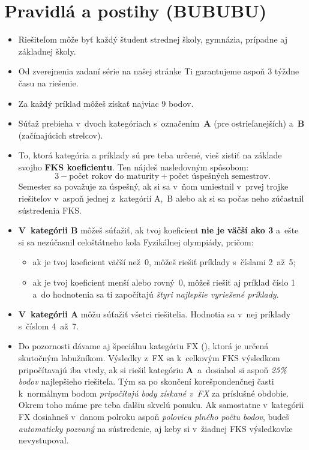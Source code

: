 \pagestyle{rules}

\section{Pravidlá a postihy (BUBUBU)}
    \begin{itemize}
        \item Riešiteľom môže byť každý študent strednej školy, gymnázia, prípadne aj základnej školy.
        
        \item Od zverejnenia zadaní série na našej stránke Ti garantujeme aspoň 3 týždne času na riešenie.
    
        \item Za každý príklad môžeš získať najviac 9 bodov. 
    
        \item Súťaž prebieha v~dvoch kategóriach s~označením~\textbf{A} (pre ostrieľanejších) a~\textbf{B} (začínajúcich strelcov).
    
        \item To, ktorá kategória a príklady sú pre teba určené, vieš zistiť na základe svojho \textbf{FKS koeficientu}. 
            Ten nájdeš nasledovným spôsobom:
            $$3 - \text{počet rokov do maturity} + \text{počet úspešných semestrov.}$$
            Semester sa považuje za úspešný, ak si sa v~ňom umiestnil v~prvej trojke riešiteľov v~aspoň jednej z~kategórií A,~B 
            alebo ak si sa počas neho zúčastnil sústredenia FKS.
        
        \item \textbf{V~kategórii B} môžeš súťažiť, ak tvoj koeficient \textbf{nie je väčší ako 3} 
            a~ešte si sa nezúčasnil celoštátneho kola Fyzikálnej olympiády, pričom:
            \begin{itemize}
                \item ak je tvoj koeficient väčší než~0, môžeš riešiť príklady s~číslami 2~až~5;
                \item ak je tvoj koeficient menší alebo rovný~0, môžeš riešiť aj príklad číslo 1 a~do hodnotenia sa ti započítajú \emph{štyri najlepšie vyriešené príklady}.
            \end{itemize}
    
        \item \textbf{V~kategórii A} môžu súťažiť všetci riešitelia. Hodnotia sa v~nej príklady s~číslom 4~až~7.
    
        \item Do pozornosti dávame aj špeciálnu kategóriu FX (),
            ktorá je určená skutočným labužníkom. Výsledky z~FX sa k~celkovým FKS výsledkom 
            pripočítavajú iba vtedy, ak si riešil kategóriu \textbf{A}~a~dosiahol si aspoň \emph{25\% bodov} najlepšieho riešiteľa.
            Tým sa po skončení korešpondenčnej časti k~normálnym bodom \emph{pripočítajú body
            získané v~FX} za príslušné obdobie. Okrem toho máme pre teba ďalšiu skvelú ponuku.
            Ak samostatne v~kategórii FX dosiahneš v~danom polroku aspoň \emph{polovicu plného počtu
            bodov}, budeš \emph{automaticky pozvaný} na sústredenie, aj keby si v~žiadnej FKS
            výsledkovke nevystupoval.
    

\end{itemize}

